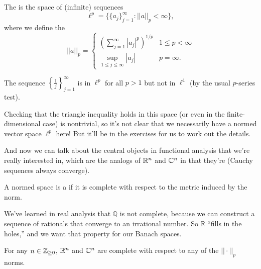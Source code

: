 \begin{definition}
The  is the space of (infinite) sequences
\[
    \ell^p = \{\{a_j\}_{j=1}^{\infty}: ||a||_p < \infty\},
\]  
where we define the 
\[
    ||a||_p = \begin{cases} \left(\sum_{j=1}^{\infty} |a_j|^p\right)^{1/p} & 1 \le p < \infty \\ \sup_{1 \le j \le \infty} |a_j| & p = \infty. \end{cases}
\]
\end{definition}

\begin{example}
The sequence $\left\{\frac{1}{j}\right\}_{j=1}^{\infty}$ is in $\ell^p$ for all $p > 1$ but not in $\ell^1$ (by the usual $p$-series test).
\end{example}

Checking that the triangle inequality holds in this space (or even in the finite-dimensional case) is nontrivial, so it's not clear that we necessarily have a normed vector space $\ell^p$ here! But it'll be in the exercises for us to work out the details.

And now we can talk about the central objects in functional analysis that we're really interested in, which are the analogs of $\mathbb R^n$ and $\mathbb C^n$ in that they're  (Cauchy sequences always converge). 

\begin{definition}
A normed space is a  if it is complete with respect to the metric induced by the norm.
\end{definition}

We've learned in real analysis that $\mathbb{Q}$ is not complete, because we can construct a sequence of rationals that converge to an irrational number. So $\mathbb{R}$ ``fills in the holes,'' and we want that property for our Banach spaces.

\begin{example}
For any $n \in \mathbb Z_{\ge 0}$, $\mathbb R^n$ and $\mathbb C^n$ are complete with respect to any of the $||\cdot||_p$ norms.
\end{example}

